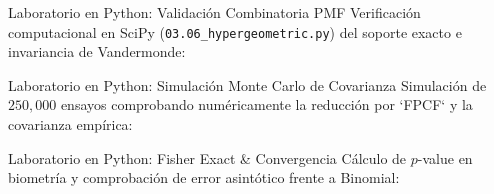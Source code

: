 \documentclass[10pt, aspectratio=169]{beamer}
\begin{document}
\begin{frame}[fragile]{Laboratorio en Python: Validación Combinatoria PMF}
  \scriptsize
  Verificación computacional en SciPy (\texttt{03.06\_hypergeometric.py}) del soporte exacto e invariancia de Vandermonde:
  \vspace{0.1cm}
  {
  }
\end{frame}

\begin{frame}[fragile]{Laboratorio en Python: Simulación Monte Carlo de Covarianza}
  \scriptsize
  Simulación de $250,000$ ensayos comprobando numéricamente la reducción por `FPCF` y la covarianza empírica:
  \vspace{0.08cm}
  {
  }
\end{frame}

\begin{frame}[fragile]{Laboratorio en Python: Fisher Exact \& Convergencia}
  \scriptsize
  Cálculo de $p$-value en biometría y comprobación de error asintótico frente a Binomial:
  \vspace{0.08cm}
  {
  }
\end{frame}
\end{document}
